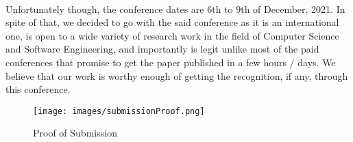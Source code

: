 \documentclass[12pt, a4paper]{extarticle}
\begin{document}
    \paragraph{} Unfortunately though, the conference dates are 6th to 9th of December, 2021. In spite of that, we decided to go with the said conference as it is an international one, is open to a wide variety of research work in the field of Computer Science and Software Engineering, and importantly is legit unlike most of the paid conferences that promise to get the paper published in a few hours / days. We believe that our work is worthy enough of getting the recognition, if any, through this conference.
    \vspace{0.25in}
    \begin{figure}[h!]
        \centering
        \texttt{[image: images/submissionProof.png]}
        \caption{Proof of Submission}
    \end{figure}
\end{document}
